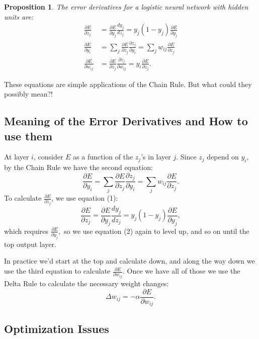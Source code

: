 \documentclass[12pt]{article}
\theoremstyle{plain}
\newtheorem{proposition}[theorem]{Proposition}
\theoremstyle{definition}
\theoremstyle{remark}
\begin{document}
\begin{mdframed}
\begin{proposition}
The error derivatives for a logistic neural network with hidden units are:
\begin{align}
\frac{\partial E}{\partial z_j} &= \frac{\partial E}{\partial y_j} \frac{dy_j}{dz_j} = y_j (1 - y_j)  \frac{\partial E}{\partial y_j} \\
\frac{\partial E}{\partial y_i} &= \sum_j \frac{\partial E}{\partial z_j} \frac{\partial z_j}{\partial y_i} = \sum_j w_{ij} \frac{\partial E}{\partial z_j} \\
\frac{\partial E}{\partial w_{ij}} &= \frac{\partial E}{\partial z_j} \frac{\partial z_j}{\partial w_{ij}} = y_i \frac{\partial E}{\partial z_j}.
\end{align}
\end{proposition}
\end{mdframed}

These equations are simple applications of the Chain Rule. But what could they possibly mean?!

\subsection{Meaning of the Error Derivatives and How to use them}

At layer $i$, consider $E$ as a function of the $z_j$'s in layer $j$. Since $z_j$ depend on $y_i$, by the Chain Rule we have the second equation: 
$$\frac{\partial E}{\partial y_i} = \sum_j \frac{\partial E}{\partial z_j} \frac{\partial z_j}{\partial y_i} = \sum_j w_{ij} \frac{\partial E}{\partial z_j}.$$ 
To calculate $ \frac{\partial E}{\partial z_j}$, we use equation (1): 
$$\frac{\partial E}{\partial z_j} = \frac{\partial E}{\partial y_j} \frac{dy_j}{dz_j} = y_j (1 - y_j)  \frac{\partial E}{\partial y_j},$$
which requires $\frac{\partial E}{\partial y_j},$ so we use equation (2) again to level up, and so on until the top output layer.

In practice we'd start at the top and calculate down, and along the way down we use the third equation to calculate $\frac{\partial E}{\partial w_{ij}}$. Once we have all of those we use the Delta Rule to calculate the necessary weight changes: $$\Delta w_{ij} = - \alpha \frac{\partial E}{\partial w_{ij}}.$$

\subsection{Optimization Issues}
\end{document}

